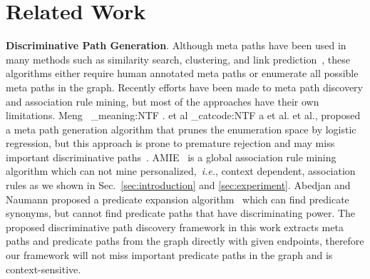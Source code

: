 \documentclass[reprint,twocolumn,showpacs,preprintnumbers,amsmath, aps,pre,amssymb]{revtex4-1}
\makeatletter
\newcommand\latinabbrev[1]{
  \peek_meaning:NTF . {%
    #1\@}%
  { \peek_catcode:NTF a {%
      #1.\@ }%
    {#1.\@}}}
\newcommand\etal{\latinabbrev{et al}}
\newcommand\ie{\emph{i.e.}}
\makeatother
\begin{document}
\section{Related Work} \label{sec:related_work}



\vspace{5pt}\noindent\textbf{Discriminative Path Generation}. Although meta paths have been used in many methods such as similarity search, clustering, and link prediction~\cite{Shi2014,Sun2011,Sun2012,Lao2010}, these algorithms either require human annotated meta paths or enumerate all possible meta paths in the graph. Recently efforts have been made to meta path discovery and association rule mining, but most of the approaches have their own limitations. Meng~\etal, proposed a meta path generation algorithm that prunes the enumeration space by logistic regression, but this approach is prone to premature rejection and may miss important discriminative paths~\cite{Meng2015}. AMIE~\cite{Galarraga2013} is a global association rule mining algorithm which can not mine personalized,~\ie, context dependent, association rules as we shown in Sec.~\ref{sec:introduction} and \ref{sec:experiment}. Abedjan and Naumann proposed a predicate expansion algorithm~\cite{Abedjan2013} which can find predicate synonyms, but cannot find predicate paths that have discriminating power. The proposed discriminative path discovery framework in this work extracts meta paths and predicate paths from the graph directly with given endpoints, therefore our framework will not miss important predicate paths in the graph and is context-sensitive.
\end{document}
